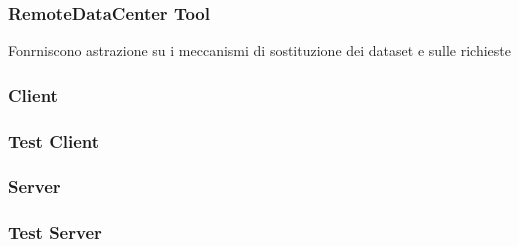 \subsubsection{RemoteDataCenter Tool}
Fonrniscono astrazione su i meccanismi di sostituzione dei dataset e sulle richieste


\subsubsection{Client}
\subsubsection{Test Client}
\subsubsection{Server}
\subsubsection{Test Server}